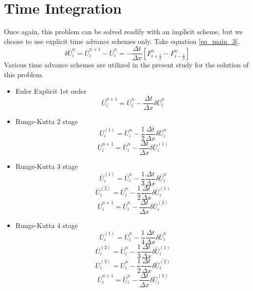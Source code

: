 \documentclass{article}
\begin{document}
\section{Time Integration}
Once again, this problem can be solved readily with an implicit scheme, but we choose to use explicit time advance schemes only. Take equation \ref{eq_main_3},
\begin{equation*}
\delta \overline{U}_i^{n} =\overline{U}_i^{n+1}-\overline{U}_i^{n}=- \dfrac{\Delta t}{\Delta x} \left[F_{i+\frac{1}{2}}^{n}-F_{i-\frac{1}{2}}^{n} \right]
\end{equation*}
Various time advance schemes are utilized in the present study for the solution of this problem.
\begin{itemize}
\item Euler Explicit 1st order
\begin{equation*}
\overline{U}_i^{n+1}=\overline{U}_i^{n}- \dfrac{\Delta t}{\Delta x} \delta \overline{U}_i^{n}
\end{equation*}
\item Runge-Kutta 2 stage
\begin{equation*}
\overline{U}_i^{(1)}=\overline{U}_i^{n}- \dfrac{1}{2}\dfrac{\Delta t}{\Delta x} \delta \overline{U}_i^{n}
\end{equation*}
\begin{equation*}
\overline{U}_i^{n+1}=\overline{U}_i^{n}- \dfrac{\Delta t}{\Delta x} \delta \overline{U}_i^{(1)}
\end{equation*}
\item Runge-Kutta 3 stage
\begin{equation*}
\overline{U}_i^{(1)}=\overline{U}_i^{n}- \dfrac{1}{3}\dfrac{\Delta t}{\Delta x} \delta \overline{U}_i^{n}
\end{equation*}
\begin{equation*}
\overline{U}_i^{(2)}=\overline{U}_i^{n}- \dfrac{1}{2}\dfrac{\Delta t}{\Delta x} \delta \overline{U}_i^{(1)}
\end{equation*}
\begin{equation*}
\overline{U}_i^{n+1}=\overline{U}_i^{n}- \dfrac{\Delta t}{\Delta x} \delta \overline{U}_i^{(2)}
\end{equation*}
\item Runge-Kutta 4 stage
\begin{equation*}
\overline{U}_i^{(1)}=\overline{U}_i^{n}- \dfrac{1}{4}\dfrac{\Delta t}{\Delta x} \delta \overline{U}_i^{n}
\end{equation*}
\begin{equation*}
\overline{U}_i^{(2)}=\overline{U}_i^{n}- \dfrac{1}{3}\dfrac{\Delta t}{\Delta x} \delta \overline{U}_i^{(1)}
\end{equation*}
\begin{equation*}
\overline{U}_i^{(3)}=\overline{U}_i^{n}- \dfrac{1}{2}\dfrac{\Delta t}{\Delta x} \delta \overline{U}_i^{(2)}
\end{equation*}
\begin{equation*}
\overline{U}_i^{n+1}=\overline{U}_i^{n}- \dfrac{\Delta t}{\Delta x} \delta \overline{U}_i^{(3)}
\end{equation*}
\end{itemize}
\end{document}

